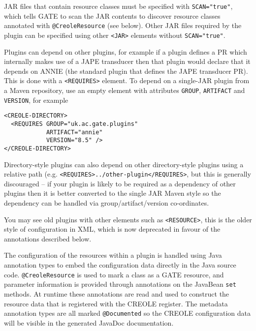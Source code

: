 JAR files that contain resource classes must be specified with
\verb|SCAN="true"|, which tells GATE to scan the JAR contents to discover
resource classes annotated with \verb|@CreoleResource| (see below).  Other JAR
files required by the plugin can be specified using other \verb|<JAR>| elements
without \verb|SCAN="true"|.

Plugins can depend on other plugins, for example if a plugin defines a PR which
internally makes use of a JAPE transducer then that plugin would declare that
it depends on ANNIE (the standard plugin that defines the JAPE transducer PR).
This is done with a \verb|<REQUIRES>| element.  To depend on a single-JAR
plugin from a Maven repository, use an empty element with attributes
\verb|GROUP|, \verb|ARTIFACT| and \verb|VERSION|, for example
\begin{small}\begin{verbatim}
<CREOLE-DIRECTORY>
  <REQUIRES GROUP="uk.ac.gate.plugins"
            ARTIFACT="annie"
            VERSION="8.5" />
</CREOLE-DIRECTORY>
\end{verbatim}\end{small}

Directory-style plugins can also depend on other directory-style plugins using
a relative path (e.g. \verb|<REQUIRES>../other-plugin</REQUIRES>|, but this is
generally discouraged -- if your plugin is likely to be required as a
dependency of other plugins then it is better converted to the single JAR Maven
style so the dependency can be handled via group/artifact/version co-ordinates.

You may see old plugins with other elements such as \verb|<RESOURCE>|, this is
the older style of configuration in XML, which is now deprecated in favour of
the annotations described below.


The configuration of the resources within a plugin is handled using Java
annotation types to embed the configuration data directly in the Java source
code.  \verb|@CreoleResource| is used to mark a class as a GATE resource, and
parameter information is provided through annotations on the JavaBean {\tt set}
methods.  At runtime these annotations are read and used to construct the
resource data that is registered with the CREOLE register.  The metadata
annotation types are all marked \verb|@Documented| so the CREOLE configuration
data will be visible in the generated JavaDoc documentation.

